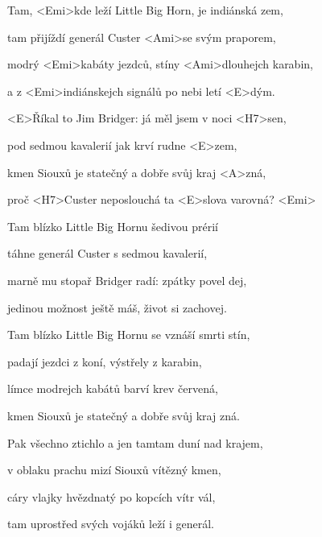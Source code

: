 

\zs
Tam, <Emi>kde leží Little Big Horn, je indiánská zem,

tam přijíždí generál Custer <Ami>se svým praporem,

modrý <Emi>kabáty jezdců, stíny <Ami>dlouhejch karabin,

a z <Emi>indiánskejch signálů po nebi letí <E>dým.
\ks

\zr
<E>Říkal to Jim Bridger: já měl jsem v noci <H7>sen,

pod sedmou kavalerií jak krví rudne <E>zem,

kmen Siouxů je statečný a dobře svůj kraj <A>zná,

proč <H7>Custer neposlouchá ta <E>slova varovná? <Emi>
\kr

\zs
Tam blízko Little Big Hornu šedivou prérií

táhne generál Custer s sedmou kavalerií,

marně mu stopař Bridger radí: zpátky povel dej,

jedinou možnost ještě máš, život si zachovej.
\ks

\zr\kr

\zs
Tam blízko Little Big Hornu se vznáší smrti stín,


padají jezdci z koní, výstřely z karabin,

límce modrejch kabátů barví krev červená,

kmen Siouxů je statečný a dobře svůj kraj zná.
\ks

\zr\kr

\zs
Pak všechno ztichlo a jen tamtam duní nad krajem,

v oblaku prachu mizí Siouxů vítězný kmen,

cáry vlajky hvězdnatý po kopcích vítr vál,

tam uprostřed svých vojáků leží i generál.
\ks

\zr\kr

\kp
